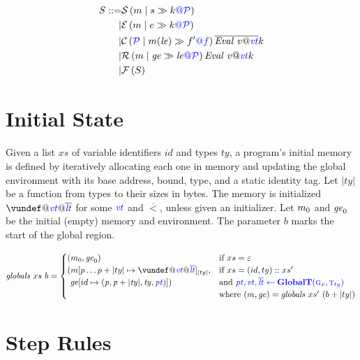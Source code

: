 \documentclass{llncs}
\begin{document}
{\[\begin{aligned}
S ::= & \sstate{\PCT}{\mem}{\stmt}{\cont} \\
| & \estate{\PCT}{\mem}{\expr}{\cont} \\
| & \cstate{f}{\PCT}{\mem}{\lenv}{f'}{\overline{\val{v}{\vt}}}{\cont} \\
| & \rstate{\PCT}{\mem}{\genv}{\lenv}{\val{v}{\vt}}{\cont} \\
| & \fstate{S} \\
\end{aligned}\]

\section{Initial State}

Given a list \(xs\) of variable identifiers \(id\) and types
\(ty\), a program's initial memory is defined by iteratively allocating each one
in memory and updating the global environment with its base address, bound, type,
and a static identity tag. Let \(|ty|\) be a function from types to their sizes
in bytes. The memory is initialized \(\vundef@\vt@\overline{\lt}\)
for some \(\vt\) and \(\overline{\lt}\), unless given an initializer.
Let \(\mem_0\) and \(\genv_0\) be the initial (empty) memory and environment.
The parameter \(b\) marks the start of the global region.


\[\mathit{globals} ~ xs ~ b =
\begin{cases}
  (\mem_0, \genv_0) & \textnormal{if } xs = \varepsilon \\
  (\mem[p \dots p+|ty| \mapsto \vundef@\vt@\overline{\lt}]_{|ty|}, & \textnormal{if } xs = (id,ty)::xs' \\
  ~ \genv[id \mapsto (\mathit{p, p+|ty|,ty,\pt})]) & \textnormal{and } \trule{\globaltres}{\globalt} \\
  & \textnormal{where } (\mem,\genv) = \mathit{globals} ~ xs' ~ (b + |ty|) \\
\end{cases}\]

\section{Step Rules}
\label{app:rules}

}
\end{document}
